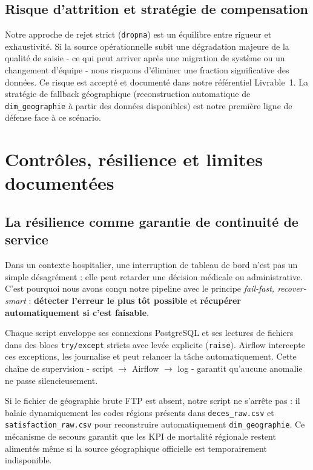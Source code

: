 \documentclass[12pt,a4paper]{report}
\begin{document}
\subsection{Risque d'attrition et stratégie de compensation}
Notre approche de rejet strict (\texttt{dropna}) est un équilibre entre rigueur et exhaustivité. Si la source opérationnelle subit une dégradation majeure de la qualité de saisie - ce qui peut arriver après une migration de système ou un changement d'équipe - nous risquons d'éliminer une fraction significative des données. Ce risque est accepté et documenté dans notre référentiel Livrable~1. La stratégie de fallback géographique (reconstruction automatique de \texttt{dim\_geographie} à partir des données disponibles) est notre première ligne de défense face à ce scénario.

\clearpage
\section{Contrôles, résilience et limites documentées}

\subsection{La résilience comme garantie de continuité de service}
Dans un contexte hospitalier, une interruption de tableau de bord n'est pas un simple désagrément : elle peut retarder une décision médicale ou administrative. C'est pourquoi nous avons conçu notre pipeline avec le principe \textit{fail-fast, recover-smart} : \textbf{détecter l'erreur le plus tôt possible} et \textbf{récupérer automatiquement si c'est faisable}.

Chaque script enveloppe ses connexions PostgreSQL et ses lectures de fichiers dans des blocs \texttt{try/except} stricts avec levée explicite (\texttt{raise}). Airflow intercepte ces exceptions, les journalise et peut relancer la tâche automatiquement. Cette chaîne de supervision - script $\rightarrow$ Airflow $\rightarrow$ log - garantit qu'aucune anomalie ne passe silencieusement.

\begin{infobox}
Si le fichier de géographie brute FTP est absent, notre script ne s'arrête pas : il balaie dynamiquement les codes régions présents dans \texttt{deces\_raw.csv} et \texttt{satisfaction\_raw.csv} pour reconstruire automatiquement \texttt{dim\_geographie}. Ce mécanisme de secours garantit que les KPI de mortalité régionale restent alimentés même si la source géographique officielle est temporairement indisponible.
\end{infobox}
\end{document}
